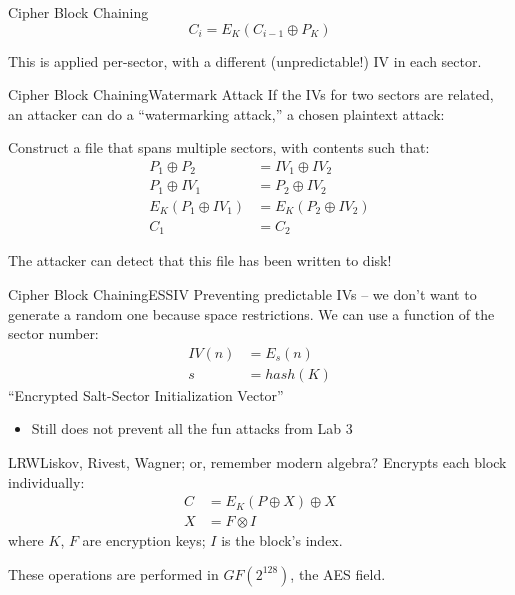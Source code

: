 \documentclass[12pt]{beamer}
\begin{document}
\begin{frame}{Cipher Block Chaining}{}
	\[ C_i = E_K(C_{i-1} \oplus P_K) \]

	This is applied per-sector, with a different (unpredictable!) IV in each sector.
\end{frame}

\begin{frame}{Cipher Block Chaining}{Watermark Attack}
	If the IVs for two sectors are related, an attacker can do a ``watermarking
	attack,'' a chosen plaintext attack:

	Construct a file that spans multiple sectors, with contents such that:
	\begin{align*}
		P_1 \oplus P_2 &= IV_1 \oplus IV_2 \\
		P_1 \oplus IV_1 &= P_2 \oplus IV_2 \\
		E_K(P_1 \oplus IV_1) &= E_K(P_2 \oplus IV_2) \\
		C_1 &= C_2
	\end{align*}

	\begin{alertblock}{}
		The attacker can detect that this file has been written to disk!
	\end{alertblock}
\end{frame}

\begin{frame}{Cipher Block Chaining}{ESSIV}
	Preventing predictable IVs -- we don't want to generate a random one because
	space restrictions. We can use a function of the sector number:
	\begin{align*}
		IV(n) &= E_s(n) \\
		s &= hash(K)
	\end{align*}
	\centering
	``Encrypted Salt-Sector Initialization Vector''

	\begin{itemize}
		\item Still does not prevent all the fun attacks from Lab 3
	\end{itemize}
\end{frame}

\begin{frame}{LRW}{Liskov, Rivest, Wagner; or, remember modern algebra?}
	Encrypts each block individually:
	\begin{align*}
		C &= E_K(P \oplus X) \oplus X \\
		X &= F \otimes I
	\end{align*}
	where $K$, $F$ are encryption keys; $I$ is the block's index.

	These operations are performed in $GF(2^{128})$, the AES field.
\end{frame}
\end{document}
